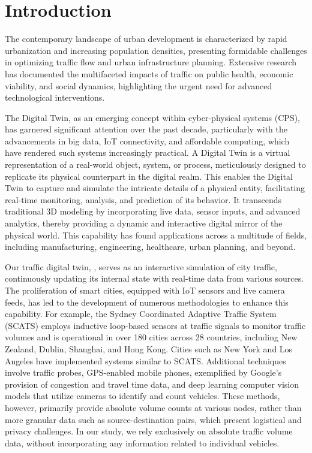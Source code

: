 \section{Introduction}

The contemporary landscape of urban development is characterized by rapid urbanization and increasing population densities, presenting formidable challenges in optimizing traffic flow and urban infrastructure planning. Extensive research has documented the multifaceted impacts of traffic on public health\cite{levy2010evaluation}, economic viability\cite{gorea2016financial}, and social dynamics\cite{anciaes2017social}, highlighting the urgent need for advanced technological interventions.


The Digital Twin, as an emerging concept within cyber-physical systems (CPS), has garnered significant attention over the past decade, particularly with the advancements in big data, IoT connectivity, and affordable computing, which have rendered such systems increasingly practical\cite{guo2017mobile}\cite{singh2021digital}. A Digital Twin is a virtual representation of a real-world object, system, or process, meticulously designed to replicate its physical counterpart in the digital realm\cite{VANDERHORN2021113524}. This enables the Digital Twin to capture and simulate the intricate details of a physical entity, facilitating real-time monitoring, analysis, and prediction of its behavior. It transcends traditional 3D modeling by incorporating live data, sensor inputs, and advanced analytics, thereby providing a dynamic and interactive digital mirror of the physical world\cite{VANDERHORN2021113524}. This capability has found applications across a multitude of fields, including manufacturing, engineering, healthcare, urban planning, and beyond.

Our traffic digital twin, \name, serves as an interactive simulation of city traffic, continuously updating its internal state with real-time data from various sources. The proliferation of smart cities, equipped with IoT sensors and live camera feeds, has led to the development of numerous methodologies to enhance this capability. For example, the Sydney Coordinated Adaptive Traffic System (SCATS)\cite{scats} employs inductive loop-based sensors at traffic signals to monitor traffic volumes and is operational in over 180 cities across 28 countries, including New Zealand, Dublin, Shanghai, and Hong Kong\cite{wiki:sydney_traffic_system}. Cities such as New York and Los Angeles have implemented systems similar to SCATS. Additional techniques involve traffic probes\cite{zhu2012probe}, GPS-enabled mobile phones\cite{rose2006mobile}, exemplified by Google’s provision of congestion and travel time data, and deep learning computer vision models that utilize cameras to identify and count vehicles. These methods, however, primarily provide absolute volume counts at various nodes, rather than more granular data such as source-destination pairs, which present logistical and privacy challenges. In our study, we rely exclusively on absolute traffic volume data, without incorporating any information related to individual vehicles.

